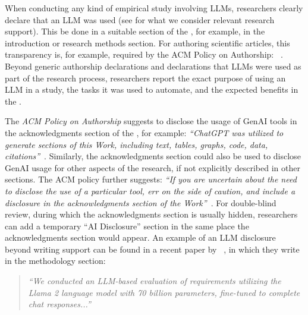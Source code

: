 
When conducting any kind of empirical study involving LLMs, researchers \must clearly declare that an LLM was used (see \scope for what we consider relevant research support).
This \should be done in a suitable section of the \paper, for example, in the introduction or research methods section.
For authoring scientific articles, this transparency is, for example, required by the ACM Policy on Authorship: ~\cite{ACM2023}.
Beyond generic authorship declarations and declarations that LLMs were used as part of the research process, researchers \should report the exact purpose of using an LLM in a study, the tasks it was used to automate, and the expected benefits in the \paper.


The \emph{ACM Policy on Authorship} suggests to disclose the usage of GenAI tools in the acknowledgments section of the \paper, for example: \emph{``ChatGPT was utilized to generate sections of this Work, including text, tables, graphs, code, data, citations''}~\cite{ACM2023}. 
Similarly, the acknowledgments section could also be used to disclose GenAI usage for other aspects of the research, if not explicitly described in other sections.
The ACM policy further suggests: \emph{``If you are uncertain about the need to disclose the use of a particular tool, err on the side of caution, and include a disclosure in the acknowledgments section of the Work''}~\cite{ACM2023}.
For double-blind review, during which the acknowledgments section is usually hidden, researchers can add a temporary ``AI Disclosure'' section in the same place the acknowledgments section would appear. 
An example of an LLM disclosure beyond writing support can be found in a recent paper by \citeauthor{DBLP:conf/re/LubosFTGMEL24}~\cite{DBLP:conf/re/LubosFTGMEL24}, in which they write in the methodology section:

\begin{quote}
\small
\it
``We conducted an LLM-based evaluation of requirements utilizing the Llama 2 language model with 70 billion parameters, fine-tuned to complete chat responses...''
\end{quote}

